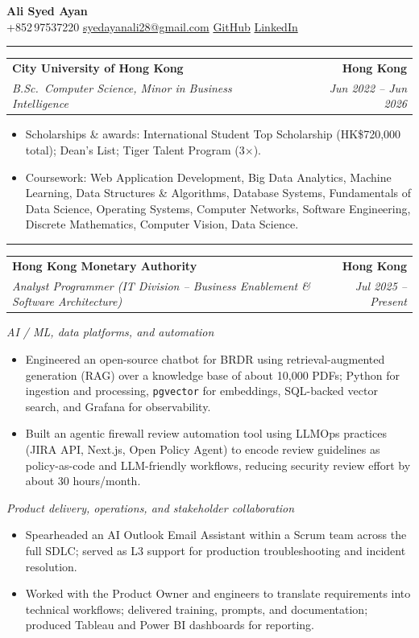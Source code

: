 \documentclass[10pt,a4paper]{article}
\makeatletter
\newcommand{\ressection}[1]{%
  \vspace{0.8em}%
  \noindent{\large\scshape\bfseries #1}\par\nobreak
  \vspace{-\parskip}%
  \vspace{-\parskip}%
  \vspace{-\parskip}%
  \vspace{-\parskip}%
  \noindent\rule{\linewidth}{0.1pt}\par\nobreak
  \vspace{-\parskip}%
}
\newcommand{\resumeSubheading}[4]{%
  \vspace{0.6em}%
  \begin{tabular*}{\textwidth}{l@{\extracolsep{\fill}}r}
    \textbf{#1} & \textbf{#2} \\
    \textit{\small #3} & \textit{\small #4} \\
  \end{tabular*}\vspace{0.32em}}
\makeatother
\begin{document}
\begin{center}
  {\LARGE\bfseries Ali Syed Ayan}\\[0.35em]
  \small
  +852\,97537220 \;\textbar\;
  \href{mailto:syedayanali28@gmail.com}{syedayanali28@gmail.com} \;\textbar\;
  \href{https://github.com/syedayanali28}{GitHub} \;\textbar\;
  \href{https://www.linkedin.com/in/syedayanali/}{LinkedIn}
\end{center}
\vspace{-0.2em}

\ressection{Education}
\resumeSubheading{City University of Hong Kong}{Hong Kong}{B.Sc.\ Computer Science, Minor in Business Intelligence}{Jun 2022 -- Jun 2026}
\begin{itemize}
  \item Scholarships \& awards: International Student Top Scholarship (HK\$720{,}000 total); Dean's List; Tiger Talent Program (3$\times$).
  \item Coursework: Web Application Development, Big Data Analytics, Machine Learning, Data Structures \& Algorithms, Database Systems, Fundamentals of Data Science, Operating Systems, Computer Networks, Software Engineering, Discrete Mathematics, Computer Vision, Data Science.
\end{itemize}

\ressection{Work Experience}

\resumeSubheading{Hong Kong Monetary Authority}{Hong Kong}{Analyst Programmer (IT Division -- Business Enablement \& Software Architecture)}{Jul 2025 -- Present}

\noindent\textit{AI / ML, data platforms, and automation}
\begin{itemize}
  \item Engineered an open-source chatbot for BRDR using retrieval-augmented generation (RAG) over a knowledge base of about 10{,}000 PDFs; Python for ingestion and processing, \texttt{pgvector} for embeddings, SQL-backed vector search, and Grafana for observability.
  \item Built an agentic firewall review automation tool using LLMOps practices (JIRA API, Next.js, Open Policy Agent) to encode review guidelines as policy-as-code and LLM-friendly workflows, reducing security review effort by about 30 hours/month.
\end{itemize}

\noindent\textit{Product delivery, operations, and stakeholder collaboration}
\begin{itemize}
  \item Spearheaded an AI Outlook Email Assistant within a Scrum team across the full SDLC; served as L3 support for production troubleshooting and incident resolution.
  \item Worked with the Product Owner and engineers to translate requirements into technical workflows; delivered training, prompts, and documentation; produced Tableau and Power BI dashboards for reporting.
\end{itemize}
\end{document}
